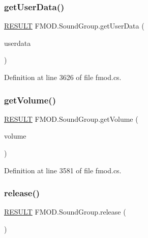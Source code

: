 \subsubsection{\texorpdfstring{get\+User\+Data()}{getUserData()}}
{\footnotesize\ttfamily \hyperlink{namespace_f_m_o_d_a305d1176ef3f8c8815861a60407ac33d}{R\+E\+S\+U\+LT} F\+M\+O\+D.\+Sound\+Group.\+get\+User\+Data (\begin{DoxyParamCaption}\item[{out Int\+Ptr}]{userdata }\end{DoxyParamCaption})}



Definition at line 3626 of file fmod.\+cs.

\mbox{\label{class_f_m_o_d_1_1_sound_group_a15bc18aab8645f3acf37404970d090f2}} 
\subsubsection{\texorpdfstring{get\+Volume()}{getVolume()}}
{\footnotesize\ttfamily \hyperlink{namespace_f_m_o_d_a305d1176ef3f8c8815861a60407ac33d}{R\+E\+S\+U\+LT} F\+M\+O\+D.\+Sound\+Group.\+get\+Volume (\begin{DoxyParamCaption}\item[{out float}]{volume }\end{DoxyParamCaption})}



Definition at line 3581 of file fmod.\+cs.

\mbox{\label{class_f_m_o_d_1_1_sound_group_a9bb0b3fae5f856aa57fcb606e6deddc1}} 
\subsubsection{\texorpdfstring{release()}{release()}}
{\footnotesize\ttfamily \hyperlink{namespace_f_m_o_d_a305d1176ef3f8c8815861a60407ac33d}{R\+E\+S\+U\+LT} F\+M\+O\+D.\+Sound\+Group.\+release (\begin{DoxyParamCaption}{ }\end{DoxyParamCaption})}



